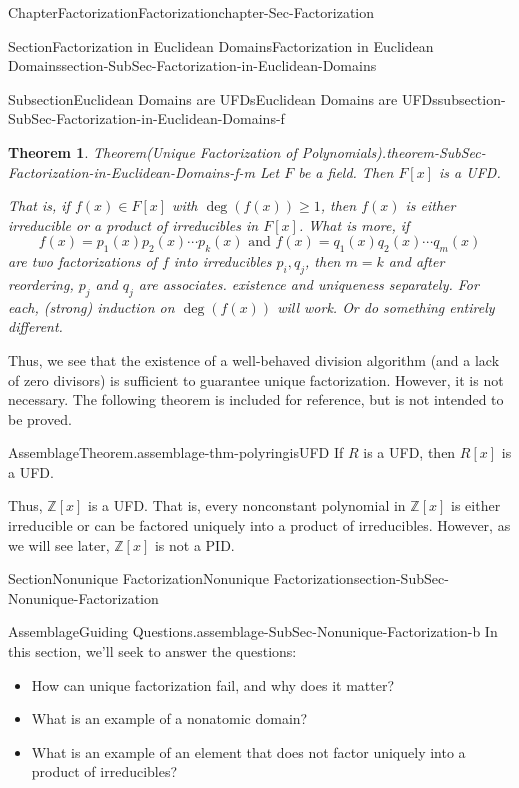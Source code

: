 \documentclass[oneside,10pt,]{book}
\numberwithin{equation}{section}
\renewcommand{\ge}{\geqslant}
\def\Z{{\mathbb Z}}
\newtheorem{theorem}{Theorem}[section]
\begin{document}
\begin{chapterptx}{Chapter}{Factorization}{}{Factorization}{}{}{chapter-Sec-Factorization}
\begin{sectionptx}{Section}{Factorization in Euclidean Domains}{}{Factorization in Euclidean Domains}{}{}{section-SubSec-Factorization-in-Euclidean-Domains}
\begin{subsectionptx}{Subsection}{Euclidean Domains are UFDs}{}{Euclidean Domains are UFDs}{}{}{subsection-SubSec-Factorization-in-Euclidean-Domains-f}
\begin{theorem}{Theorem}{(Unique Factorization of Polynomials).}{}{theorem-SubSec-Factorization-in-Euclidean-Domains-f-m}%
Let \(F\) be a field. Then \(F[x]\) is a UFD.%
\par
That is, if \(f(x) \in F[x]\) with \(\deg(f(x)) \ge 1\), then \(f(x)\) is either irreducible or a product of irreducibles in \(F[x]\). What is more, if%
\begin{equation*}
f(x) = p_1(x) p_2(x) \cdots p_k(x) \text{ and }  f(x) = q_1(x) q_2(x) \cdots q_m(x)
\end{equation*}
are two factorizations of \(f\) into irreducibles \(p_i, q_j\), then \(m=k\) and after reordering, \(p_j\) and \(q_j\) are associates.%
\noindentHandle existence and uniqueness separately. For each, (strong) induction on \(\deg(f(x))\) will work. Or do something entirely different.%
\end{theorem}
Thus, we see that the existence of a well-behaved division algorithm (and a lack of zero divisors) is sufficient to guarantee unique factorization. However, it is not necessary. The following theorem is included for reference, but is not intended to be proved.%
\begin{assemblage}{Assemblage}{Theorem.}{assemblage-thm-polyringisUFD}%
If \(R\) is a UFD, then \(R[x]\) is a UFD.%
\end{assemblage}
Thus, \(\Z[x]\) is a UFD. That is, every nonconstant polynomial in \(\Z[x]\) is either irreducible or can be factored uniquely into a product of irreducibles.  However, as we will see later, \(\Z[x]\) is not a PID.%
\end{subsectionptx}
\end{sectionptx}
%
%
\typeout{************************************************}
\typeout{************************************************}
%
\begin{sectionptx}{Section}{Nonunique Factorization}{}{Nonunique Factorization}{}{}{section-SubSec-Nonunique-Factorization}
\begin{assemblage}{Assemblage}{Guiding Questions.}{assemblage-SubSec-Nonunique-Factorization-b}%
In this section, we'll seek to answer the questions: %
\begin{itemize}[label=\textbullet]
\item{}How can unique factorization fail, and why does it matter?%
\item{}What is an example of a nonatomic domain?%
\item{}What is an example of an element that does not factor uniquely into a product of irreducibles?%

\end{itemize}
\end{assemblage}
\end{sectionptx}
\end{chapterptx}
\end{document}

